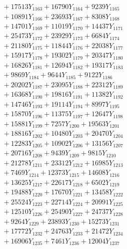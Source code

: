 \documentclass[a4paper,10pt]{article}
\begin{document}
{\begin{align}
&\;  + 17513 Y_{1163} + 16790 Y_{1164} + 9239 Y_{1165} \\[0.3ex]
&\;  + 10891 Y_{1166} + 23693 Y_{1167} + 8308 Y_{1168} \\[0.5ex]\allowbreak
&\;  + 14701 Y_{1169} + 11019 Y_{1170} + 14437 Y_{1171} \\[0.3ex]
&\;  + 25473 Y_{1172} + 23929 Y_{1173} + 6684 Y_{1174} \\[0.3ex]
&\;  + 21180 Y_{1175} + 11844 Y_{1176} + 22038 Y_{1177} \\[0.3ex]
&\;  + 15917 Y_{1178} + 19302 Y_{1179} + 20347 Y_{1180} \\[0.3ex]
&\;  + 16826 Y_{1181} + 12694 Y_{1182} + 19317 Y_{1183} \\[0.3ex]
&\;  + 9869 Y_{1184} + 9644 Y_{1185} + 9122 Y_{1186} \\[0.3ex]
&\;  + 20202 Y_{1187} + 23095 Y_{1188} + 22312 Y_{1189} \\[0.3ex]
&\;  + 16368 Y_{1190} + 19816 Y_{1191} + 11382 Y_{1192} \\[0.3ex]
&\;  + 14746 Y_{1193} + 19114 Y_{1194} + 8997 Y_{1195} \\[0.3ex]
&\;  + 15870 Y_{1196} + 11375 Y_{1197} + 12647 Y_{1198} \\[0.5ex]\allowbreak
&\;  + 15881 Y_{1199} + 7257 Y_{1200} + 19563 Y_{1201} \\[0.3ex]
&\;  + 18816 Y_{1202} + 10480 Y_{1203} + 20470 Y_{1204} \\[0.3ex]
&\;  + 12283 Y_{1205} + 10902 Y_{1206} + 13156 Y_{1207} \\[0.3ex]
&\;  + 20716 Y_{1208} + 9439 Y_{1209} + 9815 Y_{1210} \\[0.3ex]
&\;  + 21278 Y_{1211} + 23312 Y_{1212} + 16985 Y_{1213} \\[0.3ex]
&\;  + 7469 Y_{1214} + 12373 Y_{1215} + 14608 Y_{1216} \\[0.3ex]
&\;  + 13625 Y_{1217} + 22617 Y_{1218} + 6502 Y_{1219} \\[0.3ex]
&\;  + 19488 Y_{1220} + 17670 Y_{1221} + 13458 Y_{1222} \\[0.3ex]
&\;  + 25524 Y_{1223} + 22714 Y_{1224} + 20991 Y_{1225} \\[0.3ex]
&\;  + 12510 Y_{1226} + 25490 Y_{1227} + 24737 Y_{1228} \\[0.5ex]\allowbreak
&\;  + 9264 Y_{1229} + 23893 Y_{1230} + 15273 Y_{1231} \\[0.3ex]
&\;  + 17772 Y_{1232} + 24763 Y_{1233} + 21472 Y_{1234} \\[0.3ex]
&\;  + 16906 Y_{1235} + 7461 Y_{1236} + 12004 Y_{1237} \\[0.3ex]

\end{align}}
\end{document}
